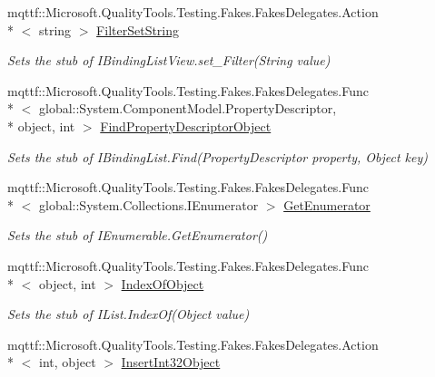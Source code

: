 \begin{DoxyCompactItemize}
mqttf\-::\-Microsoft.\-Quality\-Tools.\-Testing.\-Fakes.\-Fakes\-Delegates.\-Action\\*
$<$ string $>$ \hyperlink{class_system_1_1_component_model_1_1_fakes_1_1_stub_i_binding_list_view_aea0897a6bdcd192d65ac05dd90e648c1}{Filter\-Set\-String}
\begin{DoxyCompactList}\small\item\em Sets the stub of I\-Binding\-List\-View.\-set\-\_\-\-Filter(\-String value)\end{DoxyCompactList}\item 
mqttf\-::\-Microsoft.\-Quality\-Tools.\-Testing.\-Fakes.\-Fakes\-Delegates.\-Func\\*
$<$ global\-::\-System.\-Component\-Model.\-Property\-Descriptor, \\*
object, int $>$ \hyperlink{class_system_1_1_component_model_1_1_fakes_1_1_stub_i_binding_list_view_afe0557454b681acf6314780fa15c96dc}{Find\-Property\-Descriptor\-Object}
\begin{DoxyCompactList}\small\item\em Sets the stub of I\-Binding\-List.\-Find(\-Property\-Descriptor property, Object key)\end{DoxyCompactList}\item 
mqttf\-::\-Microsoft.\-Quality\-Tools.\-Testing.\-Fakes.\-Fakes\-Delegates.\-Func\\*
$<$ global\-::\-System.\-Collections.\-I\-Enumerator $>$ \hyperlink{class_system_1_1_component_model_1_1_fakes_1_1_stub_i_binding_list_view_a139df89e9c6fa1d8b4f66b003f61a84a}{Get\-Enumerator}
\begin{DoxyCompactList}\small\item\em Sets the stub of I\-Enumerable.\-Get\-Enumerator()\end{DoxyCompactList}\item 
mqttf\-::\-Microsoft.\-Quality\-Tools.\-Testing.\-Fakes.\-Fakes\-Delegates.\-Func\\*
$<$ object, int $>$ \hyperlink{class_system_1_1_component_model_1_1_fakes_1_1_stub_i_binding_list_view_ae01ce847d5d0c0f697a1a7f3ce6fa39e}{Index\-Of\-Object}
\begin{DoxyCompactList}\small\item\em Sets the stub of I\-List.\-Index\-Of(\-Object value)\end{DoxyCompactList}\item 
mqttf\-::\-Microsoft.\-Quality\-Tools.\-Testing.\-Fakes.\-Fakes\-Delegates.\-Action\\*
$<$ int, object $>$ \hyperlink{class_system_1_1_component_model_1_1_fakes_1_1_stub_i_binding_list_view_a5026de76e6fc8db18f80357f76f6d559}{Insert\-Int32\-Object}

\end{DoxyCompactItemize}
